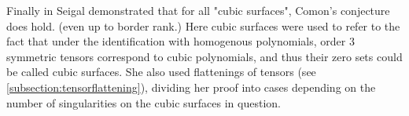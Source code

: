\documentclass[12pt,a4paper,oneside]{book}
\theoremstyle{definition}
\begin{document}
Finally in \cite{seigal_ranks_2020} Seigal demonstrated that for all "cubic surfaces", Comon's conjecture does hold. (even up to border rank.) Here cubic surfaces were used to refer to the fact that under the identification with homogenous polynomials, order $3$ symmetric tensors correspond to cubic polynomials, and thus their zero sets could be called cubic surfaces. She also used flattenings of tensors (see \cref{subsection:tensorflattening}), dividing her proof into cases depending on the number of singularities on the cubic surfaces in question.

\end{document}
